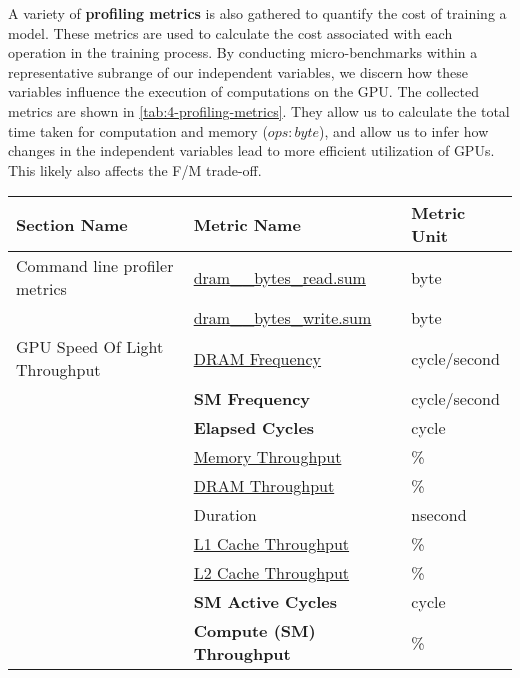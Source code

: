 A variety of \textbf{profiling metrics} is also gathered to quantify the cost of training a model. These metrics are used to calculate the cost associated with each operation in the training process. By conducting micro-benchmarks within a representative subrange of our independent variables, we discern how these variables influence the execution of computations on the GPU. The collected metrics are shown in \autoref{tab:4-profiling-metrics}. They allow us to calculate the total time taken for computation and memory ($ops:byte$), and allow us to infer how changes in the independent variables lead to more efficient utilization of GPUs. This likely also affects the F/M trade-off.

\begin{table}[t]
    \begin{tabular}{lll}
        \toprule
        Section Name                  & Metric Name                          & Metric Unit  \\
        \midrule\midrule
        Command line profiler metrics & \underline{dram\_\_bytes\_read.sum}  & byte         \\
                                      & \underline{dram\_\_bytes\_write.sum} & byte         \\
        GPU Speed Of Light Throughput & \underline{DRAM Frequency}           & cycle/second \\
                                      & \textbf{SM Frequency}                & cycle/second \\
                                      & \textbf{Elapsed Cycles}              & cycle        \\
                                      & \underline{Memory Throughput}        & \%           \\
                                      & \underline{DRAM Throughput}          & \%           \\
                                      & Duration                             & nsecond      \\
                                      & \underline{L1 Cache Throughput}      & \%           \\
                                      & \underline{L2 Cache Throughput}      & \%           \\
                                      & \textbf{SM Active Cycles}            & cycle        \\
                                      & \textbf{Compute (SM) Throughput}     & \%           \\

\end{tabular}
\end{table}
